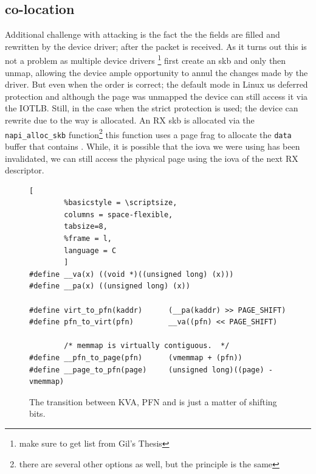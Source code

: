 \subsection{\shinfo co-location}
Additional challenge with attacking \shinfo is the fact the the fields are filled and rewritten by the device driver; after the packet is received. As it turns out this is not a problem as multiple device drivers \footnote{make sure to get list from Gil's Thesis} first create an skb and only then unmap, allowing the device ample opportunity to annul the changes made by the driver. But even when the order is correct; the default mode in Linux us deferred protection and although the page was unmapped the device can still access it via the IOTLB. Still, in the case when the strict protection is used; the device can rewrite \shinfo due to the way \shinfo is allocated. An RX skb is allocated via the \texttt{napi\_alloc\_skb} function\footnote{there are several other options as well, but the principle is the same} this function uses a page frag to allocate the \texttt{data} buffer that contains \shinfo. While, it is possible that the iova we were using has been invalidated, we can still access the physical page using the iova of the next RX descriptor.
\begin{figure}[t]
                \begin{lstlisting}[
        %basicstyle = \scriptsize,
        columns = space-flexible,
        tabsize=8,
        %frame = l,
        language = C
        ]
#define __va(x) ((void *)((unsigned long) (x)))
#define __pa(x) ((unsigned long) (x))

#define virt_to_pfn(kaddr)      (__pa(kaddr) >> PAGE_SHIFT)
#define pfn_to_virt(pfn)        __va((pfn) << PAGE_SHIFT)

        /* memmap is virtually contiguous.  */
#define __pfn_to_page(pfn)      (vmemmap + (pfn))  
#define __page_to_pfn(page)     (unsigned long)((page) - vmemmap)
                \end{lstlisting}
        \caption{ The transition between KVA, PFN and \page is just a matter of shifting bits.
                }
        \label{fig:mem_model}
\end{figure}
